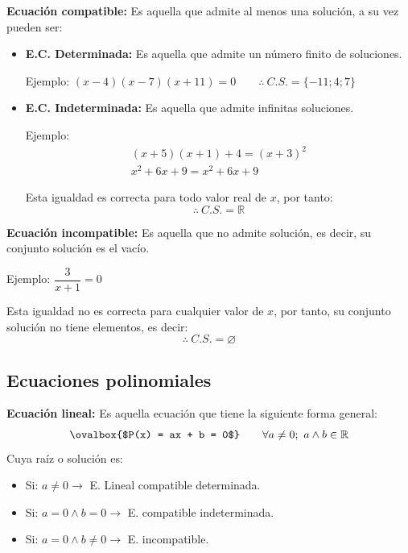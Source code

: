 \documentclass[11pt,a4paper]{article}
\begin{document}
\textcolor{azul}{\textbf{Ecuación compatible:}} Es aquella que admite al menos una solución,
a su vez pueden ser:
\begin{itemize}[label={}]
  \item \textbf{E.C. Determinada:} Es aquella que admite un número finito de soluciones.

  Ejemplo: \quad $(x-4)(x-7)(x+11) = 0 \qquad \therefore\ C.S. = \{-11; 4; 7\}$

  \item \textbf{E.C. Indeterminada:} Es aquella que admite infinitas soluciones.

  \begin{minipage}{0.5\linewidth}
  Ejemplo:
  \begin{gather*}
  (x+5)(x+1) + 4 = (x+3)^2\\
  x^2 + 6x + 9 = x^2 + 6x + 9
  \end{gather*}
  \end{minipage}%
  \begin{minipage}{0.45\linewidth}
  Esta igualdad es correcta para todo valor real de $x$, por tanto:
  \[\therefore\ C.S. = \mathbb{R}\]
  \end{minipage}
\end{itemize}

\textcolor{azul}{\textbf{Ecuación incompatible:}} Es aquella que no admite solución, es
decir, su conjunto solución es el vacío.

\begin{minipage}{0.388\textwidth}
Ejemplo: \quad $\dfrac{3}{x+1} = 0$
\end{minipage}\hfill
\begin{minipage}{0.582\textwidth}
Esta igualdad no es correcta para cualquier valor de $x$, por tanto, su conjunto solución
no tiene elementos, es decir:
\[\therefore\ C.S. = \varnothing\]
\end{minipage}


\subsection*{Ecuaciones polinomiales}

\textcolor{azul}{\textbf{Ecuación lineal:}} Es aquella ecuación que tiene la siguiente forma
general:
\[\ovalbox{$P(x) = ax + b = 0$} \qquad \forall a \neq 0;\ a \wedge b \in \mathbb{R}\]
Cuya raíz o solución es: \ 
\begin{itemize}[label=\checkmark]
  \item Si: $a \neq 0 \longrightarrow$ E. Lineal compatible determinada.
  \item Si: $a = 0 \wedge b = 0 \longrightarrow$ E. compatible indeterminada.
  \item Si: $a = 0 \wedge b \neq 0 \longrightarrow$ E. incompatible.
\end{itemize}
\end{document}
